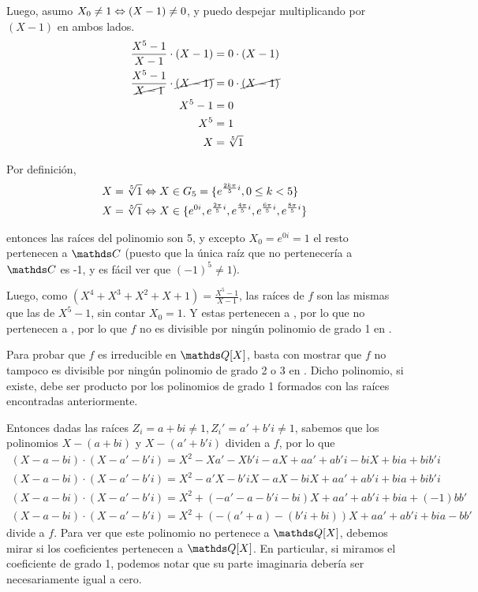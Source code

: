 \documentclass[a4paper,spanish]{article}
\begin{document}
  Luego, asumo $X_0 \neq 1 \Leftrightarrow (X-1) \neq 0$, y puedo despejar multiplicando
  por $(X-1)$ en ambos lados.
  \begin{align*}
    \frac{X^5-1}{X-1}\cdot(X-1)                   &= 0\cdot(X-1) \\
    \frac{X^5-1}{\cancel{X-1}}\cdot\cancel{(X-1)} &= 0\cdot\cancel{(X-1)} \\
    X^5-1                                         &= 0 \\
    X^5                                           &= 1 \\
    X                                             &= \sqrt[5]{1} \\
  \end{align*}

  Por definición, 
  \begin{align*}
    X=\sqrt[5]{1} &\iif X\in G_5 = \{e^{\frac{2k\pi}{5}i}, 0\leq k < 5\} \\
    X=\sqrt[5]{1} &\iif X\in \{e^{0i}, e^{\frac{2\pi}{5}i}, %
    e^{\frac{4\pi}{5}i}, e^{\frac{6\pi}{5}i}, e^{\frac{8\pi}{5}i}\}
  \end{align*}

  entonces las raíces del polinomio son 5, y excepto $X_0 = e^{0i} = 1$ el resto
  pertenecen a $\C$ (puesto que la única raíz que no pertenecería a $\C$ es -1,
  y es fácil ver que $(-1)^5 \neq 1$). 

  Luego, como $(X^4+X^3+X^2+X+1) =\frac{X^5-1}{X-1}$, las raíces de $f$ son las
  mismas que las de $X^5-1$, sin contar $X_0 = 1$. Y estas pertenecen a \C, por
  lo que no pertenecen a \Q, por lo que $f$ no es divisible por ningún polinomio
  de grado 1 en \Q.

  Para probar que $f$ es irreducible en $\Q[X]$, basta con mostrar que $f$ no
  tampoco es divisible por ningún polinomio de grado 2 o 3 en \Q. Dicho
  polinomio, si existe, debe ser producto por los polinomios de grado 1 formados
  con las raíces encontradas anteriormente. 

  Entonces dadas las raíces $Z_i = a+bi \neq 1, Z_i'=a'+b'i \neq 1$, sabemos 
  que los polinomios $X-(a+bi)$ y $X-(a'+b'i)$ dividen a $f$, por lo que
  \begin{align*}
  (X-a-bi)\cdot(X-a'-b'i)=X^2 -Xa' -Xb'i -aX +aa' +ab'i -biX +bia +bib'i \\
  (X-a-bi)\cdot(X-a'-b'i)=X^2 -a'X -b'iX -aX -biX +aa' +ab'i +bia +bib'i \\
  (X-a-bi)\cdot(X-a'-b'i)=X^2 + (-a'-a -b'i-bi)X +aa' +ab'i +bia +(-1)bb' \\
  (X-a-bi)\cdot(X-a'-b'i)=X^2 + (-(a'+a) -(b'i+bi))X +aa' +ab'i +bia -bb'
  \end{align*} 
  divide a $f$. Para ver que este polinomio no pertenece a $\Q[X]$, debemos
  mirar si los coeficientes pertenecen a $\Q[X]$. En particular, si miramos
  el coeficiente de grado 1, podemos notar que su parte imaginaria debería
  ser necesariamente igual a cero.
\end{document}
